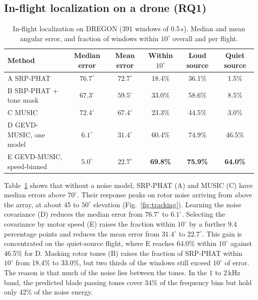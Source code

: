 \documentclass{svproc}
\begin{document}
\subsection{In-flight localization on a drone (RQ1)}
\begin{table}[t]
\renewcommand{\arraystretch}{1.05}
\centering
\scriptsize
\vspace{-15pt}
\caption{In-flight localization on DREGON (391 windows of 0.5\,s). Median and mean angular error, and fraction of windows within $10^\circ$ overall and per flight.}
\label{tab:dregon}
\begin{tabular}{|l|c|c|c|c|c|}
\hline
\textbf{Method} & \textbf{Median error} & \textbf{Mean error} & \textbf{Within $10^\circ$} & \textbf{Loud source} & \textbf{Quiet source} \\
\hline
A SRP-PHAT & $76.7^\circ$ & $72.7^\circ$ & 18.4\% & 36.1\% & 1.5\% \\
B SRP-PHAT + tone mask & $67.3^\circ$ & $59.5^\circ$ & 33.0\% & 58.6\% & 8.5\% \\
C MUSIC & $72.4^\circ$ & $67.4^\circ$ & 23.3\% & 44.5\% & 3.0\% \\
D GEVD-MUSIC, one model & $6.1^\circ$ & $31.4^\circ$ & 60.4\% & 74.9\% & 46.5\% \\
E GEVD-MUSIC, speed-binned & $\mathbf{5.0^\circ}$ & $\mathbf{22.7^\circ}$ & \textbf{69.8\%} & \textbf{75.9\%} & \textbf{64.0\%} \\
\hline
\end{tabular}
\end{table}
Table~\ref{tab:dregon} shows that without a noise model, SRP-PHAT (A) and MUSIC (C) have median errors above $70^\circ$.
Their response peaks on rotor noise arriving from above the array, at about 45 to $50^\circ$ elevation (Fig.~\ref{fig:tracking}).
Learning the noise covariance 
(D) reduces the median error from $76.7^\circ$ to $6.1^\circ$.
Selecting the covariance by motor speed (E) raises the fraction within $10^\circ$ by a further 9.4 percentage points and reduces the mean error from $31.4^\circ$ to $22.7^\circ$.
This gain is concentrated on the quiet-source flight, where E reaches 64.0\% within $10^\circ$ against 46.5\% for D.
Masking rotor tones (B) raises the fraction of SRP-PHAT within $10^\circ$ from 18.4\% to 33.0\%, but two thirds of the windows still exceed $10^\circ$ of error.
The reason is that much of the noise lies between the tones.
In the 1 to 2\,kHz band, the predicted blade passing tones cover 34\% of the frequency bins but hold only 42\% of the noise energy.
\end{document}
